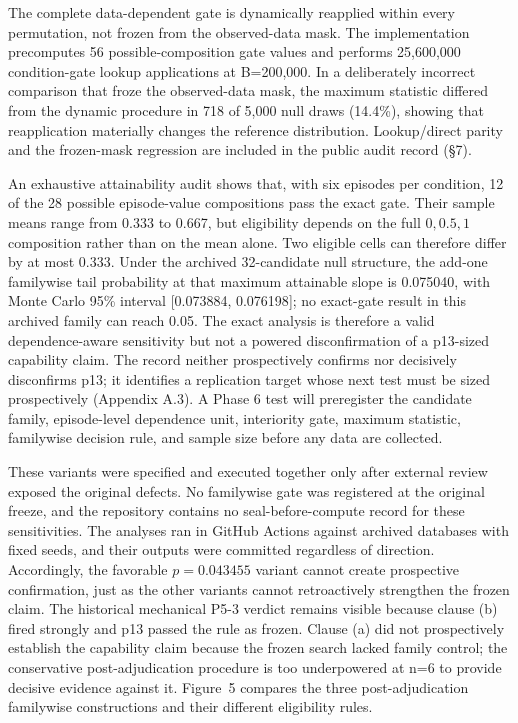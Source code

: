 \documentclass[
  11pt]{article}
\begin{document}
The complete data-dependent gate is dynamically reapplied within every
permutation, not frozen from the observed-data mask. The implementation
precomputes 56 possible-composition gate values and performs 25,600,000
condition-gate lookup applications at B=200,000. In a deliberately
incorrect comparison that froze the observed-data mask, the maximum
statistic differed from the dynamic procedure in 718 of 5,000 null draws
(14.4\%), showing that reapplication materially changes the reference
distribution. Lookup/direct parity and the frozen-mask regression are
included in the public audit record (§7).

An exhaustive attainability audit shows that, with six episodes per
condition, 12 of the 28 possible episode-value compositions pass the
exact gate. Their sample means range from 0.333 to 0.667, but
eligibility depends on the full \({0,0.5,1}\) composition rather than on
the mean alone. Two eligible cells can therefore differ by at most
0.333. Under the archived 32-candidate null structure, the add-one
familywise tail probability at that maximum attainable slope is
0.075040, with Monte Carlo 95\% interval {[}0.073884, 0.076198{]}; no
exact-gate result in this archived family can reach 0.05. The exact
analysis is therefore a valid dependence-aware sensitivity but not a
powered disconfirmation of a p13-sized capability claim. The record
neither prospectively confirms nor decisively disconfirms p13; it
identifies a replication target whose next test must be sized
prospectively (Appendix A.3). A Phase 6 test will preregister the
candidate family, episode-level dependence unit, interiority gate,
maximum statistic, familywise decision rule, and sample size before any
data are collected.

These variants were specified and executed together only after external
review exposed the original defects. No familywise gate was registered
at the original freeze, and the repository contains no
seal-before-compute record for these sensitivities. The analyses ran in
GitHub Actions against archived databases with fixed seeds, and their
outputs were committed regardless of direction. Accordingly, the
favorable \(p=0.043455\) variant cannot create prospective confirmation,
just as the other variants cannot retroactively strengthen the frozen
claim. The historical mechanical P5-3 verdict remains visible because
clause (b) fired strongly and p13 passed the rule as frozen. Clause (a)
did not prospectively establish the capability claim because the frozen
search lacked family control; the conservative post-adjudication
procedure is too underpowered at n=6 to provide decisive evidence
against it. Figure~5 compares the three post-adjudication familywise
constructions and their different eligibility rules.
\end{document}

